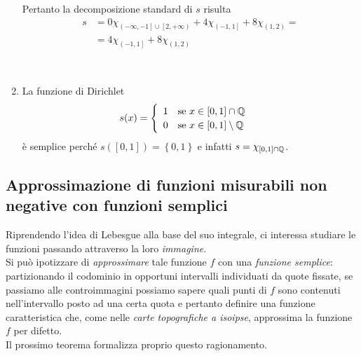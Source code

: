 \begin{examples}
\begin{enumerate}
\begin{minipage}{0.55\textwidth}
		Pertanto la decomposizione standard di $s$ risulta
		\begin{align*}
			s&=0\chi_{\left(-\infty,-1\right]\cup\left[2,+\infty\right)}+4\chi_{\left(-1,1\right]}+8\chi_{\left(1,2\right)}=\\
			&=4\chi_{\left(-1,1\right]}+8\chi_{\left(1,2\right)}
		\end{align*}
		\end{minipage}\vspace{3mm}\\
	\item La funzione di Dirichlet
		\begin{equation*}
		s(x)=
		\begin{cases}
			\begin{array}{ll}
				1&\text{se }x\in\left[0,1\right]\cap\mathbb{Q}\\
				0&\text{se }x\in\left[0,1\right]\setminus\mathbb{Q}\\
			\end{array}
		\end{cases}
	\end{equation*}
	è semplice perché $s\left(\left[0,1\right]\right)=\left\{0,1\right\}$ e infatti $s=\chi_{\left[0,1\right]\cap\mathbb{Q}}$.
	\end{enumerate}
\end{examples}
\begin{minipage}{0.55\textwidth}
\subsection{Approssimazione di funzioni misurabili non negative con funzioni semplici}
Riprendendo l'idea di Lebesgue alla base del suo integrale, ci interessa studiare le funzioni passando attraverso la loro \textit{immagine}.\\
Si può ipotizzare di \textit{approssimare} tale funzione $f$ con una \textit{funzione semplice}: partizionando il codominio in opportuni intervalli individuati da quote fissate, se passiamo alle controimmagini possiamo sapere quali punti di $f$ sono contenuti nell'intervallo posto ad una certa quota e pertanto definire una funzione caratteristica che, come nelle \textit{carte topografiche a isoipse}, approssima la funzione $f$ per difetto.\\
Il prossimo teorema formalizza proprio questo ragionamento.
\end{minipage}\hspace{2mm}
